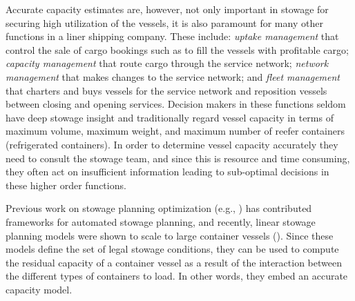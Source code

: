 Accurate capacity estimates are, however, not only important in stowage 
for securing high utilization of the vessels,
it is also paramount for many other functions in a liner shipping company. These include: {\em uptake management} that control the sale of cargo bookings such as to fill the vessels with profitable cargo; {\em capacity management} that route cargo through the service network; {\em network management} that makes changes to the service network; and {\em fleet management} that charters and buys vessels for the service network and reposition vessels between closing and opening services.  
%
Decision makers in these functions seldom have deep stowage insight and traditionally regard vessel capacity in terms of maximum volume, maximum weight, and maximum number of reefer containers (refrigerated containers). In order to determine vessel capacity accurately they need to consult the stowage team, and since this is resource and time consuming, they often act on insufficient information leading to sub-optimal decisions in these higher order functions.  

Previous work on stowage planning optimization (e.g., \cite{roach00,kimkang02,ambrosino04,low09,delgado09,pacino12}) has contributed frameworks for automated stowage planning, and recently, linear stowage planning models were shown to scale to large container vessels (\cite{pacino11,AlbertosThesis}). Since these models define the set of legal stowage conditions, they can be used to compute the residual capacity of a container vessel as a result of the interaction between the different types of containers to load. In other words, they embed an accurate capacity model. 

